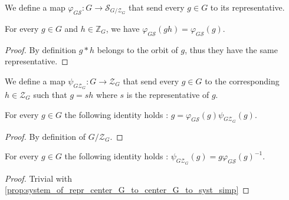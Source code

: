 \begin{definition}
    \label{def:G_to_syst}
    \leanok
    We define a map $\varphi_{G\mathcal{S}} : G \rightarrow \mathcal{S}_{G/\mathcal{Z}_G}$ that
    send every $g\in G$ to its representative.
\end{definition}

\begin{proposition}
    \label{prop:G_to_syst_simp}
    \leanok
    For every $g\in G$ and $h\in\mathbb{Z}_G$, we have $\varphi_{G\mathcal{S}}(gh)=\varphi_{G\mathcal{S}} (g)$.
\end{proposition}
\begin{proof}
    \leanok
    By definition $g*h$ belongs to the orbit of $g$, thus they have the same representative.
\end{proof}

\begin{definition}
    \label{def:G_to_center}
    \leanok
    We define a map $\psi_{G\mathcal{Z}_G} : G \rightarrow \mathcal{Z}_G$ that
    send every $g\in G$ to the corresponding $h\in \mathcal{Z}_G$ such that 
    $g=sh$ where $s$ is the representative of $g$.
\end{definition}

\begin{proposition}
    \label{prop:system_of_repr_center_G_to_center_G_to_syst_simp}
    \leanok
     For every $g\in G$ the following identity holds : $g=\varphi_{G\mathcal{S}}(g) \psi_{G\mathcal{Z}_G}(g)$.
\end{proposition}
\begin{proof}
    \leanok
    By definition of $G/\mathcal{Z}_G$.
\end{proof}

\begin{proposition}
    \label{prop:system_of_repr_center_G_to_center_eq_G_G_to_syst_simp}
    \leanok
    For every $g\in G$ the following identity holds : $\psi_{G\mathcal{Z}_G}(g)=g\varphi_{G\mathcal{S}}(g)^{-1}$.
\end{proposition}
\begin{proof}
    \leanok
    Trivial with \ref{prop:system_of_repr_center_G_to_center_G_to_syst_simp}
\end{proof}

